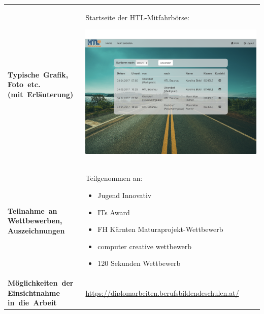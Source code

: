 \renewcommand{\arraystretch}{2}
\begin{tabularx}{1\textwidth}{ p{3.5cm} X }

\textbf{\mbox{Typische Grafik,} \mbox{Foto etc.} \mbox{(mit Erläuterung)}} & 
{
Startseite der HTL-Mitfahrbörse:
\begin{center}
	\includegraphics[width=1\linewidth]{media/images/typ_screen}
\end{center}
} \\

\textbf{\mbox{Teilnahme an} Wettbewerben, Auszeichnungen} & 
{
Teilgenommen an:
\begin{itemize}
\item Jugend Innovativ
\item ITs Award
\item FH Kärnten Maturaprojekt-Wettbewerb
\item computer creative wettbewerb
\item 120 Sekunden Wettbewerb
\end{itemize}
} \\

\textbf{\mbox{Möglichkeiten der} Einsichtnahme \mbox{in die Arbeit}} & 
{\url{https://diplomarbeiten.berufsbildendeschulen.at/}} \\



\end{tabularx}






